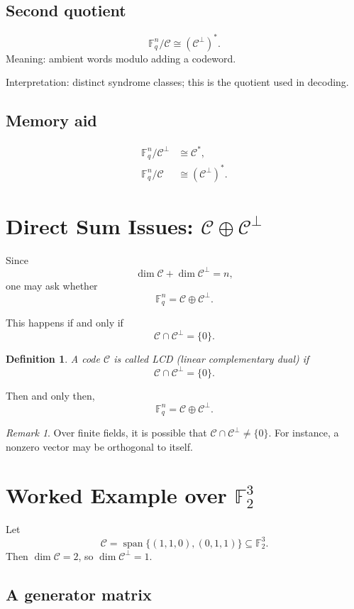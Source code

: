 \documentclass[11pt]{article}
\newtheorem{definition}{Definition}
\theoremstyle{remark}
\newtheorem{remark}{Remark}
\newcommand{\F}{\mathbb{F}}
\newcommand{\C}{\mathcal{C}}
\newcommand{\Cp}{\mathcal{C}^{\perp}}
\newcommand{\Span}{\operatorname{span}}
\begin{document}
	\subsection*{Second quotient}
	\[
	\F_q^n/\C \cong (\Cp)^*.
	\]
	Meaning: ambient words modulo adding a codeword.
	
	Interpretation: distinct syndrome classes; this is the quotient used in decoding.
	
	\subsection*{Memory aid}
	\[
	\boxed{
		\begin{aligned}
			\F_q^n/\Cp &\cong \C^*,\\
			\F_q^n/\C &\cong (\Cp)^*.
		\end{aligned}
	}
	\]
	
	\section{Direct Sum Issues: \(\C\oplus \Cp\)}
	
	Since
	\[
	\dim \C + \dim \Cp = n,
	\]
	one may ask whether
	\[
	\F_q^n = \C \oplus \Cp.
	\]
	
	This happens if and only if
	\[
	\C\cap \Cp = \{0\}.
	\]
	
	\begin{definition}
		A code \(\C\) is called \emph{LCD} (linear complementary dual) if
		\[
		\C\cap \Cp=\{0\}.
		\]
	\end{definition}
	
	Then and only then,
	\[
	\F_q^n=\C\oplus \Cp.
	\]
	
	\begin{remark}
		Over finite fields, it is possible that \(\C\cap \Cp\neq\{0\}\). For instance, a nonzero vector may be orthogonal to itself.
	\end{remark}
	
	\section{Worked Example over \(\F_2^3\)}
	
	Let
	\[
	\C = \Span\{(1,1,0),(0,1,1)\}\subseteq \F_2^3.
	\]
	Then \(\dim\C=2\), so \(\dim\Cp=1\).
	
	\subsection{A generator matrix}
	
\end{document}

